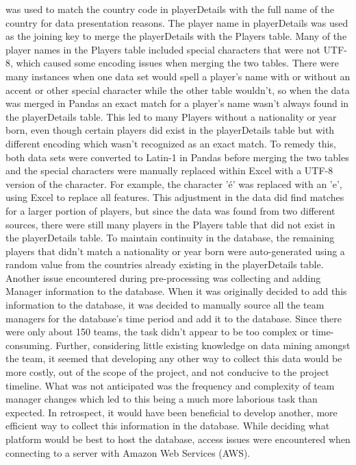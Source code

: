was used to match the country code in playerDetails with the full name of the country for data presentation reasons. The player name in playerDetails was used as the joining key to merge the playerDetails with the Players table. Many of the player names in the Players table included special characters that were not UTF-8, which caused some encoding issues when merging the two tables. There were many instances when one data set would spell a player's name with or without an accent or other special character while the other table wouldn't, so when the data was merged in Pandas an exact match for a player's name wasn't always found in the playerDetails table. This led to many Players without a nationality or year born, even though certain players did exist in the playerDetails table but with different encoding which wasn't recognized as an exact match. To remedy this, both data sets were converted to Latin-1 in Pandas before merging the two tables and the special characters were manually replaced within Excel with a UTF-8 version of the character. For example, the character '\'e' was replaced with an 'e', using Excel to replace all features. This adjustment in the data did find matches for a larger portion of players, but since the data was found from two different sources, there were still many players in the Players table that did not exist in the playerDetails table. To maintain continuity in the database, the remaining players that didn't match a nationality or year born were auto-generated using a random value from the countries already existing in the playerDetails table. Another issue encountered during pre-processing was collecting and adding Manager information to the database. When it was originally decided to add this information to the database, it was decided to manually source all the team managers for the database's time period and add it to the database. Since there were only about 150 teams, the task didn't appear to be too complex or time-consuming. Further, considering little existing knowledge on data mining amongst the team, it seemed that developing any other way to collect this data would be more costly, out of the scope of the project, and not conducive to the project timeline. What was not anticipated was the frequency and complexity of team manager changes which led to this being a much more laborious task than expected. In retrospect, it would have been beneficial to develop another, more efficient way to collect this information in the database. While deciding what platform would be best to host the database, access issues were encountered when connecting to a server with Amazon Web Services (AWS).